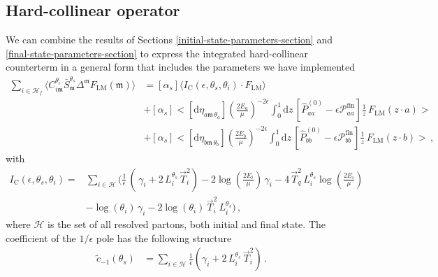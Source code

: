 \documentclass[a4paper, 12pt]{book}
\newcommand{\um}{\mathfrak{m}}
\begin{document}
\subsection{Hard-collinear operator}
We can combine the results of Sections \ref{initial-state-parameters-section} and \ref{final-state-parameters-section} to express the integrated hard-collinear counterterm in a general form that includes the parameters we have implemented
\begin{equation}
  \begin{aligned}
    \sum_{i \in \mathcal{H}_f} \langle C_{i\mathfrak{m}}^{\theta_i} \bar{S}_{\mathfrak{m}}^{\theta_s} \Delta^{\mathfrak{m}} F_{\mathrm{LM}}(\mathfrak{m})\rangle &= [\alpha_s]\langle I_{\mathrm{C}}(\epsilon, \theta_s, \theta_i) \cdot F_{\mathrm{LM}} \rangle \\
    & + [\alpha_s] \bigl< [\mathrm{d}\eta_{a\um \, \theta_a}] \left(\frac{2E_a}{\mu}\right)^{-2\epsilon} \int_{0}^{1} \mathrm{d}z \, \left[\hat{P}_{aa}^{(0)}-\epsilon \mathcal{P}_{aa}^{\mathrm{fin}}\right] \frac{1}{z} \, F_{\mathrm{LM}}(z\cdot a) \bigr> \\
    & + [\alpha_s] \bigl< [\mathrm{d}\eta_{b\um \, \theta_b}] \left(\frac{2E_b}{\mu}\right)^{-2\epsilon} \int_{0}^{1} \mathrm{d}z \, \left[\hat{P}_{bb}^{(0)}-\epsilon \mathcal{P}_{bb}^{\mathrm{fin}}\right] \frac{1}{z} \, F_{\mathrm{LM}}(z\cdot b) \bigr> \, ,
  \end{aligned}
\end{equation}
with
\begin{equation}
  \begin{aligned}
    I_{\mathrm{C}} (\epsilon, \theta_s, \theta_i) = &\sum_{i \in \mathcal{H}} \Biggl( \frac{1}{\epsilon}\, \left(\, \gamma_i+  2 \,L_i^{\theta_s} \,\vec{T}_i^2 \right) - 2 \log{\left(\frac{2E_i}{\mu}\right)}\, \gamma_i  - 4 \, \vec{T}_q^2 \, L_i^{\theta_s} \log{\left(\frac{2E_i}{\mu}\right)} \\
    & - \log{(\theta_i)} \, \gamma_i - 2 \log{(\theta_i)} \, \vec{T}_i^2 \, L_i^{\theta_s} \Biggr) \, ,
  \end{aligned}
\end{equation}
where $\mathcal{H}$ is the set of all resolved partons, both initial and final state. The coefficient of the $1/\epsilon$ pole has the following structure
\begin{equation}
  \begin{aligned}
  \tilde{c}_{-1}(\theta_s) & = \sum_{i \in \mathcal{H}} \frac{1}{\epsilon} \left( \gamma_i + 2 \, L_i^{\theta_s} \, \vec{T}_i^2 \right) \, .
  \label{coefficient-collinear}
  \end{aligned}
\end{equation}
\end{document}
